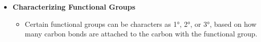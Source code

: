 \documentclass[12pt,a4paper]{article}
\begin{document}
\begin{itemize}
\begin{itemize}
\begin{itemize}
                    \begin{itemize}
                        \item {}\hspace{12pt}
                    \end{itemize}
            \end{itemize}
        \item \textbf{Characterizing Functional Groups}
            \begin{itemize}
                \item Certain functional groups can be characters as \ang{1}, \ang{2}, or \ang{3}, based on how many carbon bonds are attached to the carbon with the functional group.
            \end{itemize}
    \end{itemize}
\end{itemize}
\end{document}
